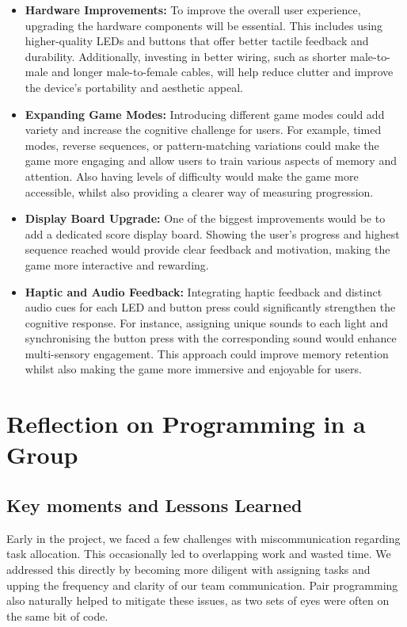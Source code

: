 \documentclass[11pt]{article}
\begin{document}
\begin{itemize}
    \item \textbf{Hardware Improvements:} 
    To improve the overall user experience, upgrading the hardware components will be essential. This includes using higher-quality LEDs and buttons that offer better tactile feedback and durability. Additionally, investing in better wiring, such as shorter male-to-male and longer male-to-female cables, will help reduce clutter and improve the device’s portability and aesthetic appeal.
    \item \textbf{Expanding Game Modes:} 
    Introducing different game modes could add variety and increase the cognitive challenge for users. For example, timed modes, reverse sequences, or pattern-matching variations could make the game more engaging and allow users to train various aspects of memory and attention. Also having levels of difficulty would make the game more accessible, whilst also providing a clearer way of measuring progression.
    \item \textbf{Display Board Upgrade:} 
    One of the biggest improvements would be to add a dedicated score display board. Showing the user’s progress and highest sequence reached would provide clear feedback and motivation, making the game more interactive and rewarding.
    \item \textbf{Haptic and Audio Feedback:} 
    Integrating haptic feedback and distinct audio cues for each LED and button press could significantly strengthen the cognitive response. For instance, assigning unique sounds to each light and synchronising the button press with the corresponding sound would enhance multi-sensory engagement. This approach could improve memory retention whilst also making the game more immersive and enjoyable for users.
\end{itemize}

\section{Reflection on Programming in a Group}
\subsection{Key moments and Lessons Learned}
Early in the project, we faced a few challenges with miscommunication regarding task allocation. This occasionally led to overlapping work and wasted time. We addressed this directly by becoming more diligent with assigning tasks and upping the frequency and clarity of our team communication. Pair programming also naturally helped to mitigate these issues, as two sets of eyes were often on the same bit of code.
\end{document}
